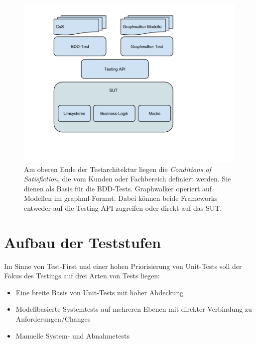 \begin{figure}[h] 
  \centering
     \includegraphics[width=1.0\textwidth]{figures/Testarchitektur-MBT-BDD-COS.png}
  \caption{Am oberen Ende der Testarchitektur liegen die \textit{Conditions of Satisfiction}, die vom Kunden oder Fachbereich definiert werden. Sie dienen als Basis für die BDD-Tests. Graphwalker operiert auf Modellen im graphml-Format. Dabei können beide Frameworks entweder auf die Testing API zugreifen oder direkt auf das SUT.}
  \label{fig:testarchitektur}
\end{figure}

\section{Aufbau der Teststufen}
Im Sinne von Test-First und einer hohen Priorisierung von Unit-Tests soll der Fokus des Testings auf drei Arten von Tests liegen:

\begin{itemize}
\item Eine breite Basis von Unit-Tests mit hoher Abdeckung
\item Modellbasierte Systemtests auf mehreren Ebenen mit direkter Verbindung zu Anforderungen/Changes
\item Manuelle System- und Abnahmetests
\end{itemize}

